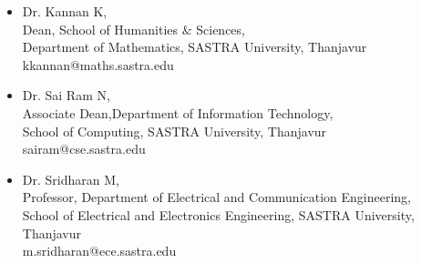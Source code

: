 \documentclass[margin, 10pt]{res} %
\begin{document}
\begin{resume}
{{{{\begin{itemize}
\item Dr. Kannan K, \\ Dean,	School of Humanities $\&$ Sciences, \\ Department of Mathematics, SASTRA University, Thanjavur\\kkannan@maths.sastra.edu

\item Dr. Sai Ram N,\\ Associate Dean,Department of Information Technology,\\ School of Computing, SASTRA University, Thanjavur\\ sairam@cse.sastra.edu

\item Dr. Sridharan M,\\ Professor, Department of Electrical and Communication Engineering,\\ School of Electrical and Electronics Engineering, SASTRA University, Thanjavur \\ m.sridharan@ece.sastra.edu

\end{itemize}
}}}}\end{resume}
\end{document}
